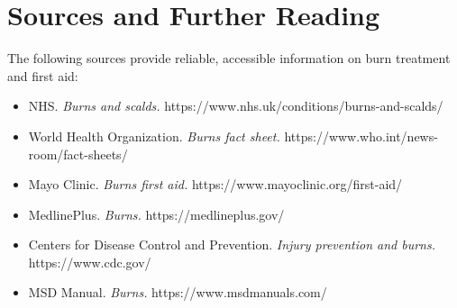 \section*{Sources and Further Reading}
The following sources provide reliable, accessible information on burn treatment and first aid:
\begin{itemize}
    \item NHS. \textit{Burns and scalds.} https://www.nhs.uk/conditions/burns-and-scalds/
    \item World Health Organization. \textit{Burns fact sheet.} https://www.who.int/news-room/fact-sheets/
    \item Mayo Clinic. \textit{Burns first aid.} https://www.mayoclinic.org/first-aid/
    \item MedlinePlus. \textit{Burns.} https://medlineplus.gov/
    \item Centers for Disease Control and Prevention. \textit{Injury prevention and burns.} https://www.cdc.gov/
    \item MSD Manual. \textit{Burns.} https://www.msdmanuals.com/
\end{itemize}
